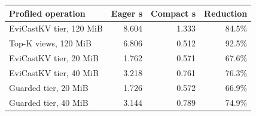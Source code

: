 \begin{tabular}{lrrr}
\toprule
Profiled operation & Eager s & Compact s & Reduction\\\midrule
EviCastKV tier, 120 MiB & 8.604 & 1.333 & 84.5\%\\
Top-K views, 120 MiB & 6.806 & 0.512 & 92.5\%\\
EviCastKV tier, 20 MiB & 1.762 & 0.571 & 67.6\%\\
EviCastKV tier, 40 MiB & 3.218 & 0.761 & 76.3\%\\
Guarded tier, 20 MiB & 1.726 & 0.572 & 66.9\%\\
Guarded tier, 40 MiB & 3.144 & 0.789 & 74.9\%\\
\bottomrule
\end{tabular}
